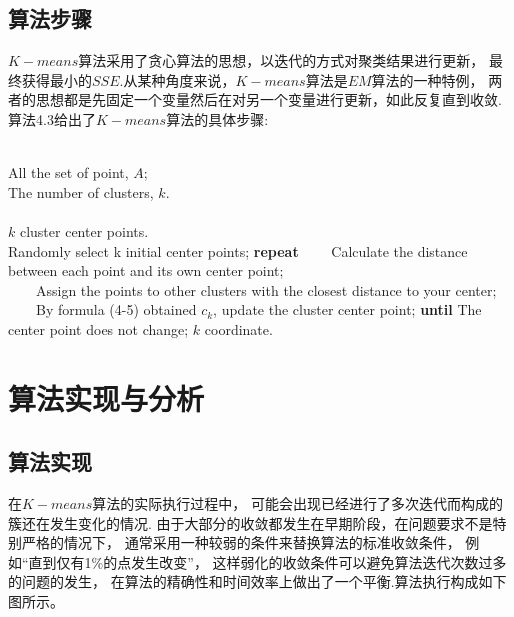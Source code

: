 \documentclass[bachelor,adobefonts]{jnuthesis}
\begin{document}
\subsection{算法步骤}

$K-means$算法采用了贪心算法的思想，以迭代的方式对聚类结果进行更新，
最终获得最小的$SSE$.从某种角度来说，$K-means$算法是$EM$算法的一种特例，
两者的思想都是先固定一个变量然后在对另一个变量进行更新，如此反复直到收敛.
算法4.3给出了$K-means$算法的具体步骤: 

  

\begin{algorithm}[htb]   
  \caption{ $K-means$}   
  \label{alg:Framwork}   
  \begin{algorithmic}[1] %
  \REQUIRE ~~\\ %
  All the set of point, $A$;\\  
  The number of clusters, $k$.\\   
  \ENSURE ~~\\ %
  $k$ cluster center points.\\
  \STATE Randomly select k initial center points;    
  \STATE  \textbf{repeat} 
  \STATE \ \ \ \ Calculate the distance between each point and its own center point; \\
  \STATE \ \ \ \ Assign the points to other clusters with the closest distance to your center;
  \STATE \ \ \ \ By formula (4-5) obtained $c_k$, update the cluster center point;
  \STATE  \textbf{until}  The center point does not change;
  \RETURN $k$ coordinate. %
  \end{algorithmic}  
  \end{algorithm}  


\section{算法实现与分析}
\subsection{算法实现}
在$K-means$算法的实际执行过程中，
可能会出现已经进行了多次迭代而构成的簇还在发生变化的情况.
由于大部分的收敛都发生在早期阶段，在问题要求不是特别严格的情况下，
通常采用一种较弱的条件来替换算法的标准收敛条件，
例如“直到仅有1\%的点发生改变”，
这样弱化的收敛条件可以避免算法迭代次数过多的问题的发生，
在算法的精确性和时间效率上做出了一个平衡.算法执行构成如下图所示。
\end{document}
